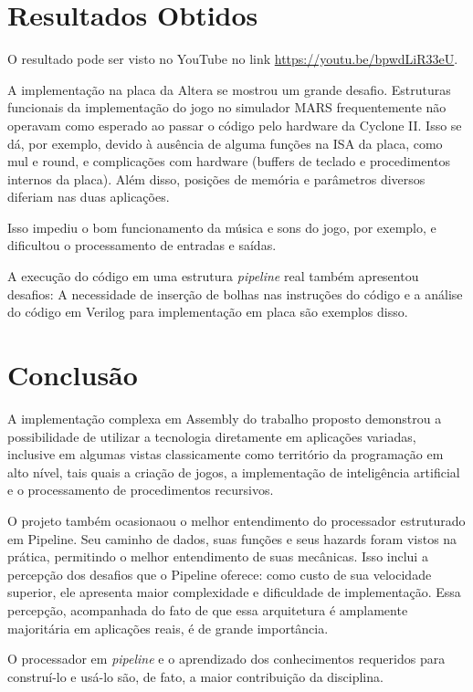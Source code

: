 \documentclass[12pt, a4paper, twocolumn]{article}
\begin{document}
\section{Resultados Obtidos}

O resultado pode ser visto no YouTube no link \url{https://youtu.be/bpwdLiR33eU}.

A implementação na placa da Altera se mostrou um grande desafio. Estruturas funcionais da implementação do jogo no simulador MARS frequentemente não operavam como esperado ao passar o código pelo hardware da Cyclone II. Isso se dá, por exemplo, devido à ausência de alguma funções na ISA da placa, como mul e round, e complicações com hardware (buffers de teclado e procedimentos internos da placa). Além disso, posições de memória e parâmetros diversos diferiam nas duas aplicações.

Isso impediu o bom funcionamento da música e sons do jogo, por exemplo, e dificultou o processamento de entradas e saídas.

A execução do código em uma estrutura \textit{pipeline} real também apresentou desafios: A necessidade de inserção de bolhas nas instruções do código e a análise do código em Verilog para implementação em placa são exemplos disso.


\section{Conclusão}

A implementação complexa em Assembly do trabalho proposto demonstrou a possibilidade de utilizar a tecnologia diretamente em aplicações variadas, inclusive em algumas vistas classicamente como território da programação em alto nível, tais quais a criação de jogos, a implementação de inteligência artificial e o processamento de procedimentos recursivos.

O projeto também ocasionaou o melhor entendimento do processador estruturado em Pipeline. Seu caminho de dados, suas funções e seus hazards foram vistos na prática, permitindo o melhor entendimento de suas mecânicas. Isso inclui a percepção dos desafios que o Pipeline oferece: como custo de sua velocidade superior, ele apresenta maior complexidade e dificuldade de implementação. Essa percepção, acompanhada do fato de que essa arquitetura é amplamente majoritária em aplicações reais, é de grande importância.

O processador em \textit{pipeline} e o aprendizado dos conhecimentos requeridos para construí-lo e usá-lo são, de fato, a maior contribuição da disciplina.
\end{document}
